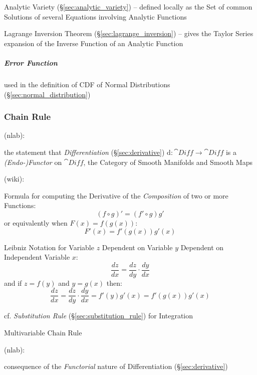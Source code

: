 Analytic Variety (\S\ref{sec:analytic_variety}) -- defined locally as the Set of
common Solutions of several Equations involving Analytic Functions

Lagrange Inversion Theorem (\S\ref{sec:lagrange_inversion}) -- gives the Taylor
Series expansion of the Inverse Function of an Analytic Function



\subparagraph{Error Function}\label{sec:error_function}\hfill

used in the definition of CDF of Normal Distributions
(\S\ref{sec:normal_distribution})



\subsubsection{Chain Rule}\label{sec:chain_rule}

(nlab):

the statement that \emph{Differentiation} (\S\ref{sec:derivative}) $\mathrm{d} :
\cat{Diff} \rightarrow \cat{Diff}$ is a \emph{(Endo-)Functor} on $\cat{Diff}$,
the Category of Smooth Manifolds and Smooth Maps

(wiki):

Formula for computing the Derivative of the \emph{Composition} of two or more
Functions:
\[
  (f \circ g)' = (f' \circ g) g'
\]
or equivalently when $F(x) = f(g(x))$:
\[
  F'(x) = f'(g(x))g'(x)
\]

Leibniz Notation for Variable $z$ Dependent on Variable $y$ Dependent on
Independent Variable $x$:
\[
  \frac{dz}{dx} = \frac{dz}{dy} \cdot \frac{dy}{dx}
\]
and if $z = f(y)$ and $y = g(x)$ then:
\[
  \frac{dz}{dx} = \frac{dz}{dy} \cdot \frac{dy}{dx}
    = f'(y)g'(x) = f'(g(x))g'(x)
\]

\fist cf. \emph{Substitution Rule} (\S\ref{sec:substitution_rule}) for
Integration

Multivariable Chain Rule

(nlab):

consequence of the \emph{Functorial} nature of Differentiation
(\S\ref{sec:derivative})

